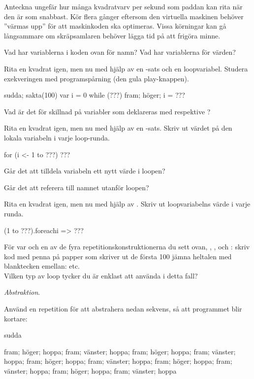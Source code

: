 \Subtask\Pen Anteckna ungefär hur många kvadratvarv per sekund som paddan kan rita när den är som snabbast. Kör flera gånger eftersom den virtuella maskinen behöver ''värmas upp'' för att maskinkoden ska optimeras. Vissa körningar kan gå långsammare om skräpsamlaren behöver lägga tid på att frigöra minne.

\Subtask\Pen Vad har variablerna i koden ovan för namn? Vad har variablerna för värden?

\Subtask Rita en kvadrat igen, men nu med hjälp av en -sats och en loopvariabel. Studera exekveringen med programspårning (den gula play-knappen).

\begin{Code}
sudda; sakta(100)
var i = 0
while (???) { fram; höger; i = ??? }
\end{Code}

\Subtask\Pen Vad är det för skillnad på variabler som deklareras med  respektive ?

\Subtask Rita en kvadrat igen, men nu med hjälp av en -sats. Skriv ut värdet på den lokala variabeln  i varje loop-runda.

\begin{Code}
for (i <- 1 to ???) { ??? }
\end{Code}

\Subtask\Pen Går det att tilldela variabeln  ett nytt värde i loopen?

\Subtask\Pen Går det att referera till namnet  utanför loopen?


\Subtask Rita en kvadrat igen, men nu med hjälp av . Skriv ut loopvariabelns värde i varje runda.

\begin{Code}
(1 to ???).foreach{i => ???}
\end{Code}

\Subtask\Pen För var och en av de fyra repetitionskonstruktionerna du sett ovan, , ,  och : skriv kod med penna på papper som skriver ut de första 100 jämna heltalen med blanktecken emellan:  etc.\\
Vilken typ av loop tycker du är enklast att använda i detta fall?



\Task \textit{Abstraktion}.

\Subtask Använd en repetition för att abstrahera nedan sekvens, så att programmet blir kortare:
\begin{Code}
sudda

fram; höger; hoppa; fram; vänster; hoppa; fram; höger;
hoppa; fram; vänster; hoppa; fram; höger; hoppa; fram;
vänster; hoppa; fram; höger; hoppa; fram; vänster; hoppa;
fram; höger; hoppa; fram; vänster; hoppa
\end{Code}


